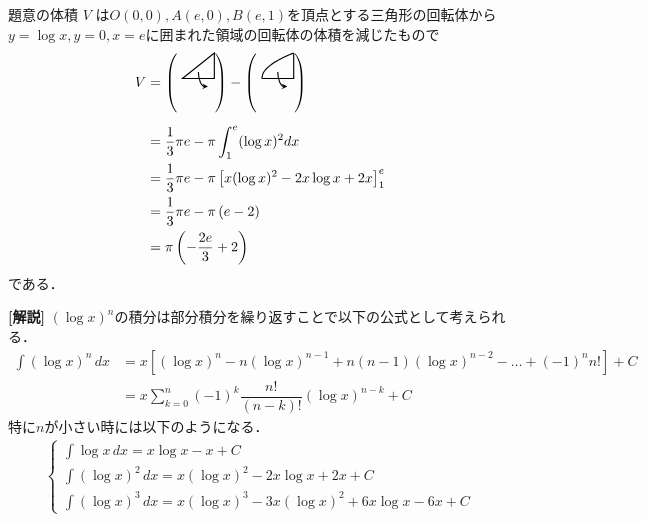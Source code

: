 \documentclass[../../main.tex]{subfiles}
\begin{document}
題意の体積 $V$ は$O(0,0), A(e,0), B(e,1)$を頂点とする三角形の回転体から$y=\log x, y=0, x=e$に囲まれた領域の回転体の体積を減じたもので
\begin{align}
  V &=
  \left( \text{
      \begin{tikzpicture}[baseline={(0,-0.2)}, scale=0.8, >=stealth]
        \draw[thick] (0,0) -- (1,0) -- (1,0.8) -- cycle;
        \draw[->, thick] (0.5, 0.2) to[out=-90, in=180] (0.8, -0.25);
  \end{tikzpicture}} \right)
  -
  \left( \text{
      \begin{tikzpicture}[baseline={(0,-0.2)}, scale=0.8, >=stealth]
        \draw[thick] (0,0) -- (1,0) -- (1,0.8);
        \draw[thick, domain=0:1, samples=30] plot (\x, {0.8*sqrt(\x)});
        \draw[->, thick] (0.5, 0.2) to[out=-90, in=180] (0.8, -0.25);
  \end{tikzpicture}} \right) \\[2mm]
  &= \dfrac{1}{3}\pi e - \pi\int_1^e (\log x)^2 dx \\
  &= \dfrac{1}{3}\pi e - \pi\left[x(\log x)^2-2x\log x+2x\right]_1^e \\
  &= \dfrac{1}{3}\pi e - \pi\left(e-2\right) \\
  &= \pi\left(-\dfrac{2e}{3}+2\right)
\end{align}
である．

{\bf [解説]}
$(\log x)^n$の積分は部分積分を繰り返すことで以下の公式として考えられる．
\begin{align}
  \int (\log x)^n \, dx
  &= x \left[ (\log x)^n - n(\log x)^{n-1} + n(n-1)(\log x)^{n-2} - \dots + (-1)^n n! \right] + C \\
  &= x \sum_{k=0}^{n} (-1)^k \dfrac{n!}{(n-k)!} (\log x)^{n-k} + C
\end{align}
特に$n$が小さい時には以下のようになる．
\begin{align}
  \begin{cases}
    \int \log x \, dx = x \log x - x + C \\
    \int (\log x)^2 \, dx = x (\log x)^2 - 2x \log x + 2x + C \\
    \int (\log x)^3 \, dx = x (\log x)^3 - 3x (\log x)^2 + 6x \log x - 6x + C
  \end{cases}
\end{align}

\newpage
\end{document}
